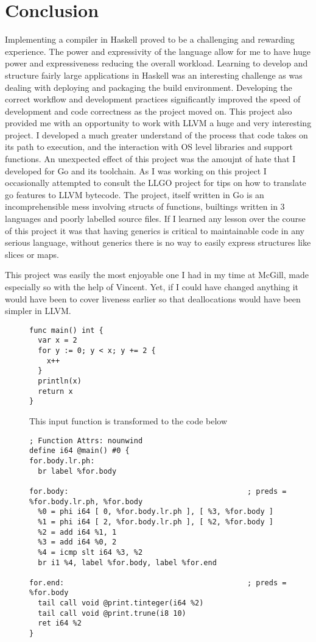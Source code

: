 \documentclass[11pt]{article}
\begin{document}
\section{Conclusion}

Implementing a compiler in Haskell proved to be a challenging and rewarding experience. The power and expressivity of the language allow for me to have huge power and expressiveness reducing the overall workload. Learning to develop and structure fairly large applications in Haskell was an interesting challenge as was dealing with deploying and packaging the build environment. Developing the correct workflow and development practices significantly improved the speed of development and code correctness as the project moved on. 
This project also provided me with an opportunity to work with LLVM a huge and very interesting project. I developed a much greater understand of the process that code takes on its path to execution, and the interaction with OS level libraries and support functions. 
An unexpected effect of this project was the amoujnt of hate that I developed for Go and its toolchain. As I was working on this project I occasionally attempted to consult the LLGO project for tips on how to translate go features to LLVM bytecode. The project, itself written in Go is an incomprehensible mess involving structs of functions, builtings written in 3 languages and poorly labelled source files. If I learned any lesson over the course of this project it was that having generics is critical to maintainable code in any serious language, without generics there is no way to easily express structures like slices or maps. 

This project was easily the most enjoyable one I had in my time at McGill, made especially so with the help of Vincent. Yet, if I could have changed anything it would have been to cover liveness earlier so that deallocations would have been simpler in LLVM. 

\begin{figure}
\begin{lstlisting}
func main() int {
  var x = 2
  for y := 0; y < x; y += 2 {
    x++
  }
  println(x)
  return x
}
\end{lstlisting}
This input function is transformed to the code below
\begin{lstlisting}
; Function Attrs: nounwind
define i64 @main() #0 {
for.body.lr.ph:
  br label %for.body

for.body:                                         ; preds = %for.body.lr.ph, %for.body
  %0 = phi i64 [ 0, %for.body.lr.ph ], [ %3, %for.body ]
  %1 = phi i64 [ 2, %for.body.lr.ph ], [ %2, %for.body ]
  %2 = add i64 %1, 1
  %3 = add i64 %0, 2
  %4 = icmp slt i64 %3, %2
  br i1 %4, label %for.body, label %for.end

for.end:                                          ; preds = %for.body
  tail call void @print.tinteger(i64 %2)
  tail call void @print.trune(i8 10)
  ret i64 %2
}
\end{lstlisting}
\label{code}
\end{figure}
\end{document}
